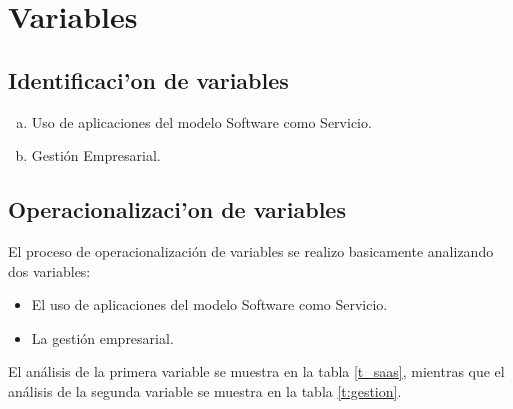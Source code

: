 \section{Variables}

\subsection{Identificaci'on de variables}

\begin{enumerate}[a., noitemsep]
    \item Uso de aplicaciones del modelo Software como Servicio.
    \item Gesti\'on Empresarial.
\end{enumerate}

\subsection{Operacionalizaci'on de variables}
El proceso de operacionalizaci\'on de variables se realizo basicamente analizando dos variables:
\begin{itemize}[noitemsep]
    \item El uso de aplicaciones del modelo Software como Servicio.
    \item La gesti\'on empresarial.
\end{itemize}
El an\'alisis de la primera variable se muestra en la tabla \ref{t_saas}, mientras
que el an\'alisis de la segunda variable se muestra en la tabla \ref{t:gestion}.

